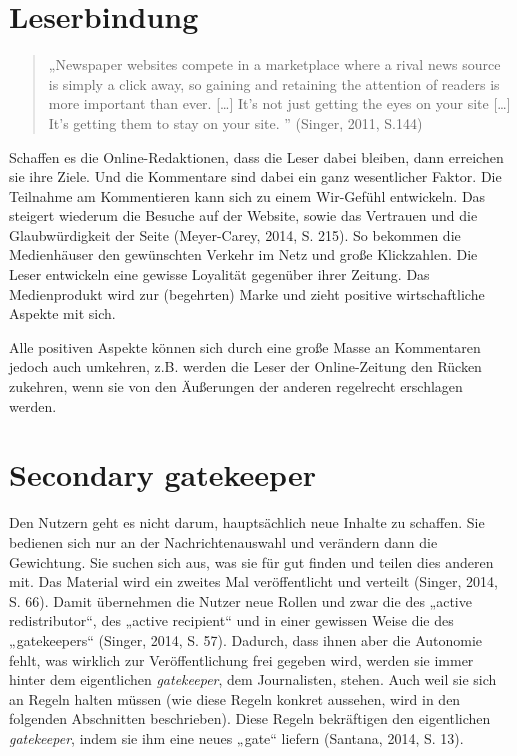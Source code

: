 \section{Leserbindung}

\begin{quote}
„Newspaper websites compete in a marketplace where a rival news source is simply
a click away, so gaining and retaining the attention of readers is more
important than ever. [\ldots] It’s not just getting the eyes on your site
[\ldots] It’s getting them to stay on your site. ” (Singer, 2011, S.144)
\end{quote}

Schaffen es die Online-Redaktionen, dass die Leser dabei bleiben, dann erreichen
sie ihre Ziele. Und die Kommentare sind dabei ein ganz wesentlicher Faktor. Die
Teilnahme am Kommentieren kann sich zu einem Wir-Gefühl entwickeln. Das steigert
wiederum die Besuche auf der Website, sowie das Vertrauen und die
Glaubwürdigkeit der Seite (Meyer-Carey, 2014, S. 215). So bekommen die
Medienhäuser den gewünschten Verkehr im Netz und große Klickzahlen. Die Leser
entwickeln eine gewisse Loyalität gegenüber ihrer Zeitung. Das Medienprodukt
wird zur (begehrten) Marke und zieht positive wirtschaftliche Aspekte mit sich.

Alle positiven Aspekte können sich durch eine große Masse an Kommentaren jedoch
auch umkehren, z.B. werden die Leser der Online-Zeitung den Rücken zukehren,
wenn sie von den Äußerungen der anderen regelrecht erschlagen werden.


\section{Secondary gatekeeper}

Den Nutzern geht es nicht darum, hauptsächlich neue Inhalte zu schaffen. Sie
bedienen sich nur an der Nachrichtenauswahl und verändern dann die Gewichtung.
Sie suchen sich aus, was sie für gut finden und teilen dies anderen mit. Das
Material wird ein zweites Mal veröffentlicht und verteilt (Singer, 2014, S. 66).
Damit übernehmen die Nutzer neue Rollen und zwar die des „active redistributor“,
des „active recipient“ und in einer gewissen Weise die des „gatekeepers“
(Singer, 2014, S. 57). Dadurch, dass ihnen aber die Autonomie fehlt, was
wirklich zur Veröffentlichung frei gegeben wird, werden sie immer hinter dem
eigentlichen \emph{gatekeeper}, dem Journalisten, stehen. Auch weil sie sich an
Regeln halten müssen (wie diese Regeln konkret aussehen, wird in den folgenden
Abschnitten beschrieben). Diese Regeln bekräftigen den eigentlichen
\emph{gatekeeper}, indem sie ihm eine neues „gate“ liefern (Santana, 2014, S.
13).

